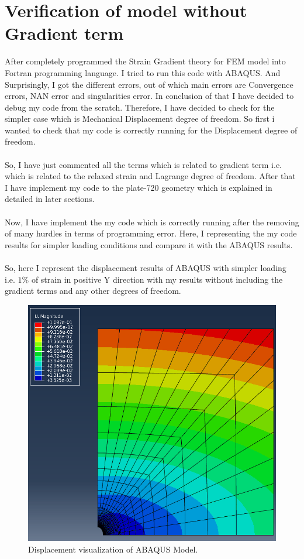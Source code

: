 \documentclass[12pt]{article}
\begin{document}
\section{Verification of model without Gradient term}
After completely programmed the Strain Gradient theory for FEM model into Fortran programming language. I tried to run this code with ABAQUS. And Surprisingly, I got the different errors, out of which main errors are Convergence errors, NAN error and singularities error. In conclusion of that I have decided to debug my code from the scratch. Therefore, I have decided to check for the simpler case which is Mechanical Displacement degree of freedom. So first i wanted to check that my code is correctly running for the Displacement degree of freedom.
\\
\\
So, I have just commented all the terms which is related to gradient term i.e. which is related to the relaxed strain and Lagrange degree of freedom. After that I have implement my code to the plate-720 geometry which is explained in detailed in later sections.
\\
\\ 
Now, I have implement the my code which is correctly running after the removing of many hurdles in terms of programming error. Here, I representing the my code results for simpler loading conditions and compare it with the ABAQUS results.  
\\
\\
So, here I represent the displacement results of ABAQUS with simpler loading i.e. $ 1 \% $ of strain in positive Y direction with my results without including the gradient terms and any other degrees of freedom.
\begin{figure}[H]
	\begin{center}
		\includegraphics[scale=0.4]{ABAQUS_result.png}  
	\end{center}  
    \caption{Displacement visualization of ABAQUS Model.}
\end{figure}
\end{document}

